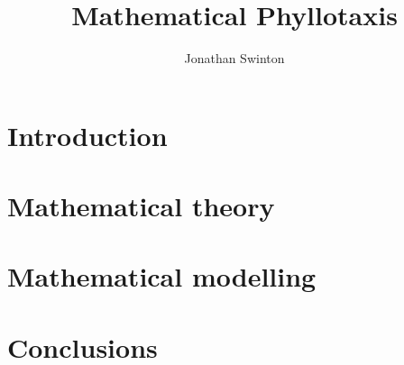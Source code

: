 \documentclass[a4paper]{memoir}
\begin{document}
\author{Jonathan Swinton}
\title{Mathematical Phyllotaxis}






%

\tableofcontents

\mainmatter%


\part{Introduction}




\part{Mathematical theory}




\part{Mathematical modelling}





\part{Conclusions}



\backmatter%


\printbibliography

\printindex
\end{document}

